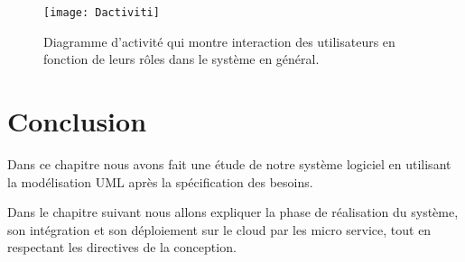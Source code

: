    \begin{figure}[H]
   	\centering
   	\texttt{[image: Dactiviti]}
   	\caption{Diagramme d'activité qui  montre interaction des  utilisateurs   en fonction de leurs rôles dans le système en général.}
   	\label{fig:dactiviti}
   \end{figure}
     
   \section{Conclusion}
   
   Dans ce chapitre nous avons fait une étude de notre système logiciel en utilisant la modélisation UML après la spécification des besoins.
   
     Dans le chapitre suivant nous allons expliquer la phase de réalisation du système, son intégration et son déploiement sur le  cloud par les micro service, tout en respectant les directives de la conception.
    
   
